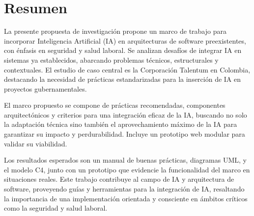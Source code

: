 
\section*{Resumen}

La presente propuesta de investigación propone un marco de trabajo para incorporar Inteligencia Artificial (IA) en arquitecturas de software preexistentes, con énfasis en seguridad y salud laboral. Se analizan desafíos de integrar IA en sistemas ya establecidos, abarcando problemas técnicos, estructurales y contextuales. El estudio de caso central es la Corporación Talentum en Colombia, destacando la necesidad de prácticas estandarizadas para la inserción de IA en proyectos gubernamentales.

El marco propuesto se compone de prácticas recomendadas, componentes arquitectónicos y criterios para una integración eficaz de la IA, buscando no solo la adaptación técnica sino también el aprovechamiento máximo de la IA para garantizar su impacto y perdurabilidad. Incluye un prototipo web modular para validar su viabilidad.

Los resultados esperados son un manual de buenas prácticas, diagramas UML, y el modelo C4, junto con un prototipo que evidencie la funcionalidad del marco en situaciones reales. Este trabajo contribuye al campo de IA y arquitectura de software, proveyendo guías y herramientas para la integración de IA, resaltando la importancia de una implementación orientada y consciente en ámbitos críticos como la seguridad y salud laboral.




